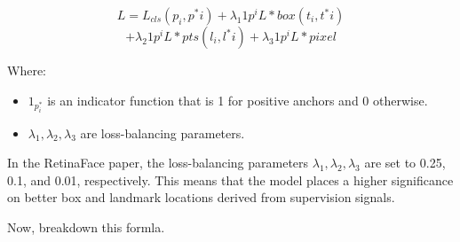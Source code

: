 \documentclass{article}
\begin{document}
\[ L = L_{cls}(p_i, p^*i) + \lambda_1 1{p^i} L*{box}(t_i, t^*i) \]
\[+ \lambda_2 1{p^i} L*{pts}(l_i, l^*i) + \lambda_3 1{p^i} L*{pixel} \]

Where:

\begin{itemize}
\item \( 1_{p^*_i} \) is an indicator function that is 1 for positive anchors and 0 otherwise.
\item \( \lambda_1, \lambda_2, \lambda_3 \) are loss-balancing parameters.
\end{itemize}

In the RetinaFace paper, the loss-balancing parameters \( \lambda_1, \lambda_2, \lambda_3 \) are set to 0.25, 0.1, and 0.01, respectively. This means that the model places a higher significance on better box and landmark locations derived from supervision signals.

Now, breakdown this formla.
\end{document}
